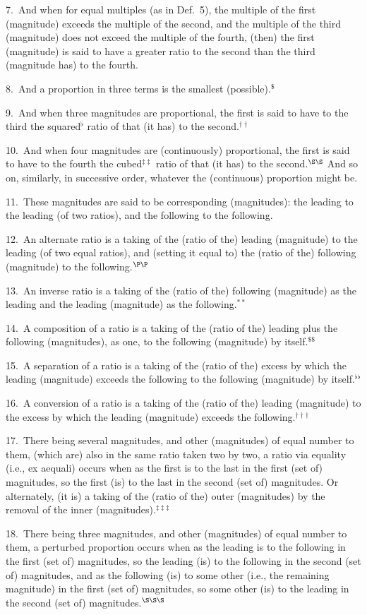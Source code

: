 \begin{Parallel}{}{}
{7.~And when for equal multiples (as in Def.~5), the multiple of the first (magnitude) exceeds 
the multiple of the second, and the multiple of the third (magnitude) does not
exceed the multiple of the fourth, (then) the first (magnitude) is said to have a greater ratio
to the second than the third (magnitude has) to the fourth.

8.~And a  proportion in three terms is the smallest (possible).$^\$$

9.~And when three magnitudes are proportional, the first is said to
have to the third the squared$^\flat$ ratio  of that (it has) to the second.$^{\dag\dag}$

10.~And when four magnitudes are (continuously) proportional, the first is said to have to the fourth the cubed$^{\ddag\ddag}$ ratio  of that (it has) to the second.$^{\S\S}$ And  so on,   similarly, in successive order, whatever the (continuous) proportion
might be.

11.~These magnitudes are said to be corresponding (magnitudes):
the leading to the leading (of two ratios), and
the following to the following.

12.~An alternate ratio is a taking of the (ratio of the) leading  (magnitude) to the leading (of two equal ratios), and (setting it equal to) the (ratio of the)
following   (magnitude) to the following.$^{\P\P}$

13.~An inverse  ratio is a taking of the (ratio of the) following (magnitude) as the leading and the leading (magnitude) as the
following.$^{\ast\ast}$

14.~A composition of a  ratio is a taking of the (ratio of the) leading plus the following (magnitudes),
as one, to the  following (magnitude) by itself.$^{\$\$}$

 15.~A separation of a  ratio is a taking of the (ratio of the) excess by which the
 leading (magnitude) exceeds the following to the following (magnitude)
 by itself.$^{\flat\flat}$
 
16.~A conversion  of a ratio is a taking of the (ratio of the) leading (magnitude) 
 to the excess by which the leading (magnitude) exceeds the following.$^{\dag\dag\dag}$
 
17.~There being several magnitudes,
   and  other (magnitudes)
 of equal  number to them, (which are)  also in
 the same ratio taken two by two,
  a  ratio via equality (i.e.,  ex aequali) occurs when  as the first is to the last  in the first (set of) magnitudes, so  the first (is) to the last   in the second (set of) magnitudes. Or alternately, (it is) a taking of the (ratio of the) outer (magnitudes) by the removal of the 
 inner (magnitudes).$^{\ddag\ddag\ddag}$
 
18.~There being three magnitudes,
  and  other (magnitudes)
 of equal  number to them,  a  perturbed proportion occurs  when  as 
 the  leading is to the following
 in the first (set of) magnitudes, so the  leading (is) to the following  in the second (set of) magnitudes, and as   the following (is) to
 some other ({\rm i.e.}, the remaining magnitude) in the first (set of) magnitudes, so some other (is)  to the leading  in the second (set of) magnitudes.$^{\S\S\S}$}
\end{Parallel}
